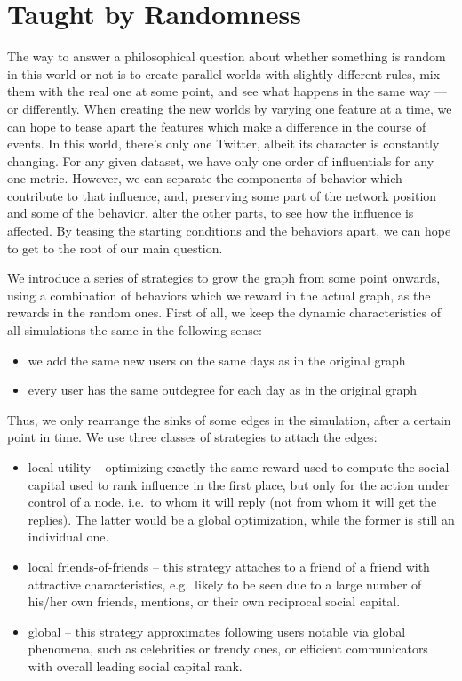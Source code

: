 \documentclass[10pt,oneside]{memoir}
\begin{document}
\section{Taught by Randomness}
\label{taughtbyrandomness}

The way to answer a philosophical question about whether something is random in this world or not is to create parallel worlds with slightly different rules, mix them with the real one at some point, and see what happens in the same way --- or differently.  When creating the new worlds by varying one feature at a time, we can hope to tease apart the features which make a difference in the course of events.  In this world, there's only one Twitter, albeit its character is constantly changing.  For any given dataset, we have only one order of influentials for any one metric.  However, we can separate the components of behavior which contribute to that influence, and, preserving some part of the network position and some of the behavior, alter the other parts, to see how the influence is affected.  By teasing the starting conditions and the behaviors apart, we can hope to get to the root of our main question.


We introduce a series of strategies to grow the graph from some point onwards, using a combination of behaviors which we reward in the actual graph, as the rewards in the random ones.  First of all, we keep the dynamic characteristics of all simulations the same in the following sense:


\begin{itemize}


\item we add the same new users on the same days as in the original graph

\item every user has the same outdegree for each day as in the original graph
\end{itemize}

Thus, we only rearrange the sinks of some edges in the simulation, after a certain point in time.  We use three classes of strategies to attach the edges:


\begin{itemize}


\item local utility -- optimizing exactly the same reward used to compute the social capital used to rank influence in the first place, but only for the action under control of a node, i.e.\ to whom it will reply (not from whom it will get the replies).  The latter would be a global optimization, while the former is still an individual one.

\item local friends-of-friends -- this strategy attaches to a friend of a friend with attractive characteristics, e.g.\ likely to be seen due to a large number of his/her own friends, mentions, or their own reciprocal social capital.

\item global -- this strategy approximates following users notable via global phenomena, such as celebrities or trendy ones, or efficient communicators with overall leading social capital rank.
\end{itemize}
\end{document}

